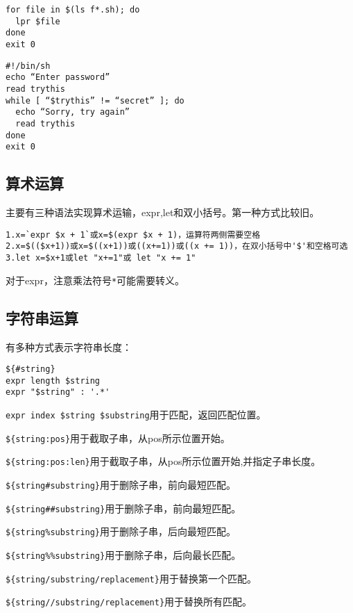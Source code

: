 \begin{verbatim}
for file in $(ls f*.sh); do
  lpr $file
done
exit 0
\end{verbatim}

\begin{verbatim}
#!/bin/sh
echo “Enter password”
read trythis
while [ “$trythis” != “secret” ]; do
  echo “Sorry, try again”
  read trythis
done
exit 0
\end{verbatim}





\subsection{算术运算}
主要有三种语法实现算术运输，expr,let和双小括号。第一种方式比较旧。
\begin{verbatim}
1.x=`expr $x + 1`或x=$(expr $x + 1)，运算符两侧需要空格
2.x=$(($x+1))或x=$((x+1))或((x+=1))或((x += 1))，在双小括号中'$'和空格可选
3.let x=$x+1或let "x+=1"或 let "x += 1"
\end{verbatim}
对于expr，注意乘法符号\verb$*$可能需要转义。

\subsection{字符串运算}
有多种方式表示字符串长度：
\begin{verbatim}
${#string}
expr length $string
expr "$string" : '.*'
\end{verbatim}

\verb|expr index $string $substring|用于匹配，返回匹配位置。

\verb|${string:pos}|用于截取子串，从pos所示位置开始。

\verb|${string:pos:len}|用于截取子串，从pos所示位置开始,并指定子串长度。

\verb|${string#substring}|用于删除子串，前向最短匹配。

\verb|${string##substring}|用于删除子串，前向最短匹配。

\verb|${string%substring}|用于删除子串，后向最短匹配。

\verb|${string%%substring}|用于删除子串，后向最长匹配。

\verb|${string/substring/replacement}|用于替换第一个匹配。

\verb|${string//substring/replacement}|用于替换所有匹配。



\begin{verbatim}

\end{verbatim}


